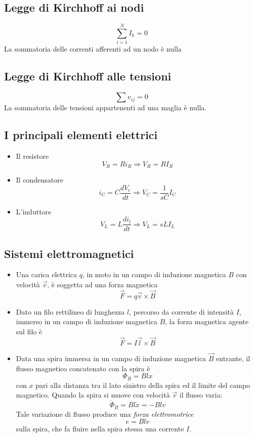 \documentclass[a4paper]{report}
\begin{document}
\subsection{Legge di Kirchhoff ai nodi}
\begin{equation}\label{eq:kirchhoff-nodi}
  \sum_{i=1}^{N} I_k = 0
\end{equation}
La sommatoria delle correnti afferenti ad un nodo \`e nulla

\subsection{Legge di Kirchhoff alle tensioni}
\begin{equation}\label{eq:kirchhoff-tensioni}
  \sum v_{ij} = 0
\end{equation}
La sommatoria delle tensioni appartenenti ad una maglia \`e nulla.

\subsection{I principali elementi elettrici}

\begin{itemize}
  \item Il resistore
    $$ V_R = R i_R \Rightarrow V_R = R I_R$$
  \item Il condensatore
    $$ i_C = C \frac{dV_c}{dt} \Rightarrow V_C = \frac{1}{sC} I_C$$
  \item L'induttore
    $$V_L = L \frac{di_l}{dt} \Rightarrow V_L = sL I_L$$
\end{itemize}

\subsection{Sistemi elettromagnetici}

\begin{itemize}
  \item Una carica elettrica $q$, in moto in un campo di induzione
    magnetica $B$ con velocit\`a $\vec{v}$, \`e soggetta ad una forza
    magnetica $$ \vec{F} = q \vec{v} \times \vec{B}$$
  \item Dato un filo rettilineo di lunghezza $l$, percorso da corrente
    di intensit\`a $I$, immerso in un campo di induzione magnetica
    $B$, la forza magnetica agente sul filo \`e $$\vec{F} = I \vec{l}
    \times \vec{B}$$
  \item Data una spira immersa in un campo di induzione
    magnetica $\vec{B}$ entrante, il flusso magnetico concatenato con
    la spira \`e $$\Phi_B = Blx$$ con $x$ pari alla distanza tra il
    lato sinistro della spira ed il limite del campo magnetico. Quando
    la spira si muove con velocit\`a $\vec{v}$ il flusso varia:
    $$\dot{\Phi}_B = Bl \dot{x} = -Blv$$
    Tale variazione di flusso produce una {\em forza
      elettromotrice}
    $$e = Blv$$ sulla spira, che fa fluire nella spira stessa una
    corrente $I$.
\end{itemize}
\end{document}

